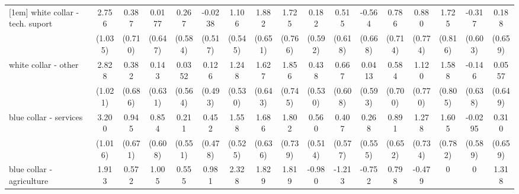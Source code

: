 {\begin{tabular}{l*{16}{c}}
[1em]
white collar - tech. suport&       2.756\sym{**} &       0.387         &      0.0177         &       0.267         &     -0.0238         &       1.106\sym{*}  &       1.882\sym{**} &       1.725\sym{*}  &       0.182         &       0.515         &      -0.564         &       0.786         &       0.880         &       1.725\sym{*}  &      -0.317         &       0.188         \\
                    &     (1.035)         &     (0.710)         &     (0.647)         &     (0.584)         &     (0.517)         &     (0.545)         &     (0.651)         &     (0.766)         &     (0.592)         &     (0.618)         &     (0.668)         &     (0.714)         &     (0.774)         &     (0.816)         &     (0.603)         &     (0.659)         \\
[1em]
white collar - other&       2.828\sym{**} &       0.382         &       0.143         &      0.0352         &       0.126         &       1.248\sym{*}  &       1.627\sym{*}  &       1.856\sym{*}  &       0.438         &       0.667         &      0.0413         &       0.584         &       1.120         &       1.588\sym{*}  &      -0.146         &      0.0557         \\
                    &     (1.021)         &     (0.686)         &     (0.631)         &     (0.564)         &     (0.493)         &     (0.530)         &     (0.643)         &     (0.745)         &     (0.530)         &     (0.608)         &     (0.593)         &     (0.700)         &     (0.770)         &     (0.805)         &     (0.638)         &     (0.649)         \\
[1em]
blue collar - services&       3.200\sym{**} &       0.945         &       0.854         &       0.211         &       0.452         &       1.558\sym{**} &       1.686\sym{**} &       1.802\sym{*}  &       0.560         &       0.407         &       0.268         &       0.891         &       1.278         &       1.605\sym{*}  &     -0.0295         &       0.310         \\
                    &     (1.016)         &     (0.671)         &     (0.608)         &     (0.551)         &     (0.478)         &     (0.525)         &     (0.636)         &     (0.739)         &     (0.514)         &     (0.577)         &     (0.555)         &     (0.652)         &     (0.734)         &     (0.782)         &     (0.589)         &     (0.659)         \\
[1em]
blue collar - agriculture&       1.913         &       0.572         &       1.005         &       0.555         &       0.981         &       2.328\sym{**} &       1.829\sym{*}  &       1.819         &      -0.980         &      -1.213         &      -0.752         &       0.798         &      -0.479         &           0         &           0         &       1.318         \\

\end{tabular}}

